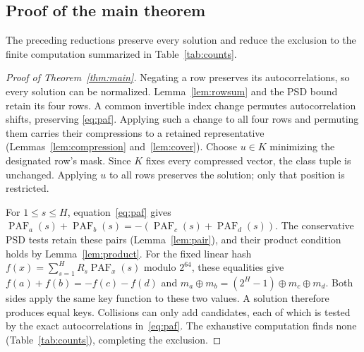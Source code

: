 \documentclass[11pt]{article}
\newcommand{\PAF}{\operatorname{PAF}}
\begin{document}
\subsection{Proof of the main theorem}\label{sec:overview}
The preceding reductions preserve every solution and reduce the exclusion to
the finite computation summarized in Table~\ref{tab:counts}.

\begin{proof}[Proof of Theorem~\ref{thm:main}]
Negating a row preserves its autocorrelations, so every solution can be
normalized. Lemma~\ref{lem:rowsum} and the PSD bound retain its four rows.
A common invertible index change permutes autocorrelation shifts, preserving
\eqref{eq:paf}. Applying such a change to all four rows and permuting them
carries their compressions to a retained representative
(Lemmas~\ref{lem:compression} and~\ref{lem:cover}). Choose $u\in K$
minimizing the designated row's mask. Since $K$ fixes every compressed
vector, the class tuple is unchanged. Applying $u$ to all rows preserves
the solution; only that position is restricted.

For $1\leq s\leq H$, equation~\eqref{eq:paf} gives
$\PAF_a(s)+\PAF_b(s)=-(\PAF_c(s)+\PAF_d(s))$.
The conservative PSD tests retain these pairs (Lemma~\ref{lem:pair}),
and their product condition holds by Lemma~\ref{lem:product}.
For the fixed linear hash $f(x)=\sum_{s=1}^{H}R_s\PAF_x(s)$ modulo
$2^{64}$, these equalities give
$f(a)+f(b)=-f(c)-f(d)$ and
$m_a\oplus m_b=(2^H-1)\oplus m_c\oplus m_d$.
Both sides apply the same key function to these two values. A solution
therefore produces equal keys. Collisions can only add candidates, each
of which is tested by the exact autocorrelations in~\eqref{eq:paf}. The exhaustive computation
finds none (Table~\ref{tab:counts}), completing the exclusion.
\end{proof}
\end{document}
